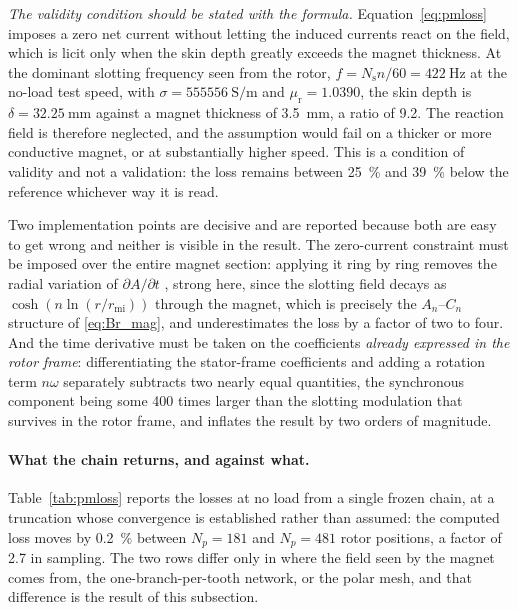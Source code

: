 \documentclass[10pt,a4paper,twocolumn]{article}
\newcommand{\rmi}{r_{\mathrm{mi}}}
\theoremstyle{plain}
\theoremstyle{remark}
\begin{document}
\emph{The validity condition should be stated with the formula.}
Equation~\eqref{eq:pmloss} imposes a zero net current without letting the
induced currents react on the field, which is licit only when the skin
depth greatly exceeds the magnet thickness. At the dominant slotting
frequency seen from the rotor, $f=N_{\mathrm{s}}n/60=\SI{422}{\hertz}$
at the no-load test speed, with $\sigma=\SI{555556}{\siemens\per\metre}$
and $\mu_{\mathrm{r}}=\num{1.0390}$, the skin depth is
$\delta=\SI{32.25}{\milli\metre}$ against a magnet thickness of
\SI{3.5}{\milli\metre}, a ratio of \num{9.2}. The reaction field is
therefore neglected, and the assumption would fail on a thicker or more
conductive magnet, or at substantially higher speed. This is a condition
of validity and not a validation: the loss remains between
\SI{25}{\percent} and \SI{39}{\percent} below the reference whichever
way it is read.

Two implementation points are decisive and are reported because both are
easy to get wrong and neither is visible in the result. The zero-current
constraint must be imposed over the entire magnet section: applying it
ring by ring removes the radial variation of $\partial A/\partial t$
, strong here, since the slotting field decays as
$\cosh(n\ln(r/\rmi))$ through the magnet, which is precisely the
$A_n$--$C_n$ structure of \eqref{eq:Br_mag}, and underestimates the
loss by a factor of two to four. And the time derivative must be taken
on the coefficients \emph{already expressed in the rotor frame}:
differentiating the stator-frame coefficients and adding a rotation term
$n\omega$ separately subtracts two nearly equal quantities, the
synchronous component being some 400 times larger than the slotting
modulation that survives in the rotor frame, and inflates the result by
two orders of magnitude.

\paragraph{What the chain returns, and against what.}
Table~\ref{tab:pmloss} reports the losses at no load from a single
frozen chain, at a truncation whose convergence is established rather
than assumed: the computed loss moves by \SI{0.2}{\percent} between
$N_p=181$ and $N_p=481$ rotor positions, a factor of \num{2.7} in
sampling. The two rows differ only in where the field seen by the magnet
comes from, the one-branch-per-tooth network, or the polar mesh, and
that difference is the result of this subsection.
\end{document}

